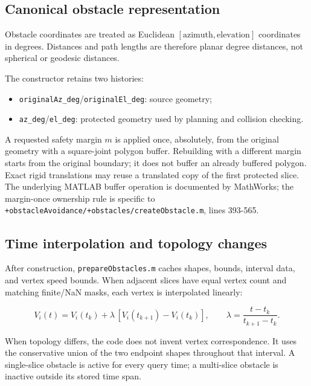 \documentclass[10pt,letterpaper]{article}
\newcommand{\file}[1]{\nolinkurl{#1}}
\newcommand{\src}[2]{\file{#1}, lines #2}
\begin{document}
\subsection{Canonical obstacle representation}

Obstacle coordinates are treated as Euclidean $[\mathrm{azimuth},
\mathrm{elevation}]$ coordinates in degrees. Distances and path lengths are
therefore planar degree distances, not spherical or geodesic distances.

The constructor retains two histories:

\begin{itemize}
  \item \file{originalAz_deg}/\file{originalEl_deg}: source geometry;
  \item \file{az_deg}/\file{el_deg}: protected geometry used by planning and
  collision checking.
\end{itemize}

A requested safety margin $m$ is applied once, absolutely, from the original
geometry with a square-joint polygon buffer. Rebuilding with a different
margin starts from the original boundary; it does not buffer an already
buffered polygon. Exact rigid translations may reuse a translated copy of the
first protected slice. The underlying MATLAB buffer operation is documented by
MathWorks\cite{mathworksPolybuffer}; the margin-once ownership rule is specific
to \src{+obstacleAvoidance/+obstacles/createObstacle.m}{393-565}.

\subsection{Time interpolation and topology changes}

After construction, \file{prepareObstacles.m} caches shapes, bounds, interval
data, and vertex speed bounds. When adjacent slices have equal vertex count and
matching finite/NaN masks, each vertex is interpolated linearly:

\begin{equation}
V_i(t)=V_i(t_k)+\lambda\,[V_i(t_{k+1})-V_i(t_k)],\qquad
\lambda=\frac{t-t_k}{t_{k+1}-t_k}.
\end{equation}

When topology differs, the code does not invent vertex correspondence. It uses
the conservative union of the two endpoint shapes throughout that interval.
A single-slice obstacle is active for every query time; a multi-slice obstacle
is inactive outside its stored time span.
\end{document}

